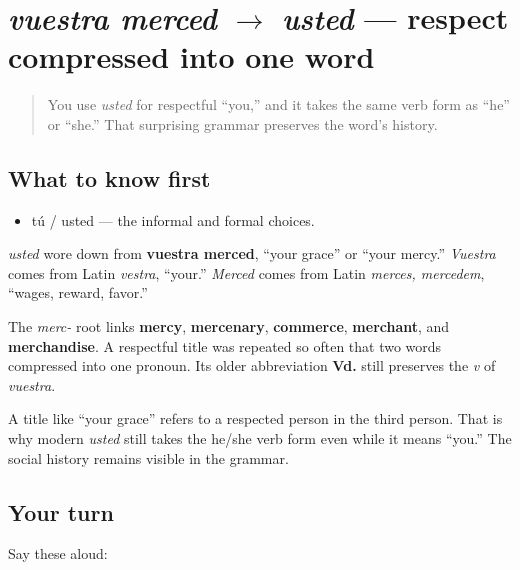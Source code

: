 \section[vuestra merced to usted]{\emph{vuestra merced} $\to$ \emph{usted} — respect compressed into one word}

\label{lesson:ES-C03-usted-origin}



\begin{quote}
You use \emph{usted} for respectful \textquotedblleft{}you,\textquotedblright{} and it takes the same verb form as \textquotedblleft{}he\textquotedblright{} or \textquotedblleft{}she.\textquotedblright{} That surprising grammar preserves the word's history.
\end{quote}

\subsection*{What to know first}
\begin{itemize}
\raggedright
  \item tú / usted — the informal and formal choices.
\end{itemize}

\begin{cousinweb}
\emph{usted} wore down from \textbf{vuestra merced}, \textquotedblleft{}your grace\textquotedblright{} or \textquotedblleft{}your mercy.\textquotedblright{} \emph{Vuestra} comes from Latin \emph{vestra}, \textquotedblleft{}your.\textquotedblright{} \emph{Merced} comes from Latin \emph{merces, mercedem}, \textquotedblleft{}wages, reward, favor.\textquotedblright{}

The \emph{merc-} root links \textbf{mercy}, \textbf{mercenary}, \textbf{commerce}, \textbf{merchant}, and \textbf{merchandise}. A respectful title was repeated so often that two words compressed into one pronoun. Its older abbreviation \textbf{Vd.} still preserves the \emph{v} of \emph{vuestra}.
\end{cousinweb}

\begin{culture}
A title like \textquotedblleft{}your grace\textquotedblright{} refers to a respected person in the third person. That is why modern \emph{usted} still takes the he/she verb form even while it means \textquotedblleft{}you.\textquotedblright{} The social history remains visible in the grammar.
\end{culture}

\subsection*{Your turn}
Say these aloud:

